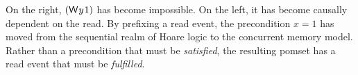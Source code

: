 On the right, $(\DW{y}{1})$ has become impossible.  On the left, it has become
causally dependent on the read.  By prefixing a read event, the precondition
$x=1$ has moved from the sequential realm of Hoare logic to the concurrent
memory model.  Rather than a precondition that must be \emph{satisfied}, the
resulting pomset has a read event that must be \emph{fulfilled}.


